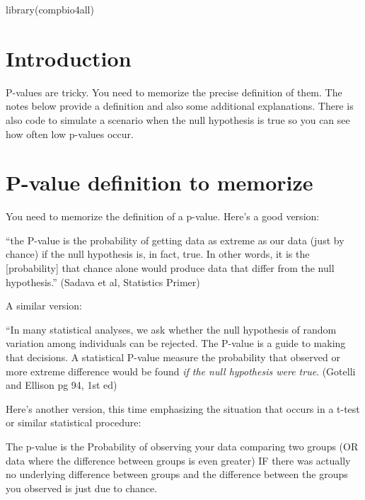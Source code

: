 \documentclass[
]{book}
\newenvironment{Shaded}{\begin{snugshade}}{\end{snugshade}}
\newcommand{\FunctionTok}[1]{\textcolor[rgb]{0.00,0.00,0.00}{#1}}
\newcommand{\NormalTok}[1]{#1}
\begin{document}
\begin{Shaded}
\begin{Highlighting}[]
\FunctionTok{library}\NormalTok{(compbio4all)}
\end{Highlighting}
\end{Shaded}

\hypertarget{introduction-7}{%
\chapter{Introduction}\label{introduction-7}}

P-values are tricky. You need to memorize the precise definition of them. The notes below provide a definition and also some additional explanations. There is also code to simulate a scenario when the null hypothesis is true so you can see how often low p-values occur.

\hypertarget{p-value-definition-to-memorize}{%
\chapter{P-value definition to memorize}\label{p-value-definition-to-memorize}}

You need to memorize the definition of a p-value. Here's a good version:

``the P-value is the probability of getting data as extreme as our data (just by chance) if the null hypothesis is, in fact, true. In other words, it is the {[}probability{]} that chance alone would produce data that differ from the null hypothesis.'' (Sadava et al, Statistics Primer)

A similar version:

``In many statistical analyses, we ask whether the null hypothesis of random variation among individuals can be rejected. The P-value is a guide to making that decisions. A statistical P-value measure the probability that observed or more extreme difference would be found \emph{if the null hypothesis were true}. (Gotelli and Ellison pg 94, 1st ed)

Here's another version, this time emphasizing the situation that occurs in a t-test or similar statistical procedure:

The p-value is the Probability of observing your data comparing two groups (OR data where the difference between groups is even greater) IF there was actually no underlying difference between groups and the difference between the groups you observed is just due to chance.
\end{document}
